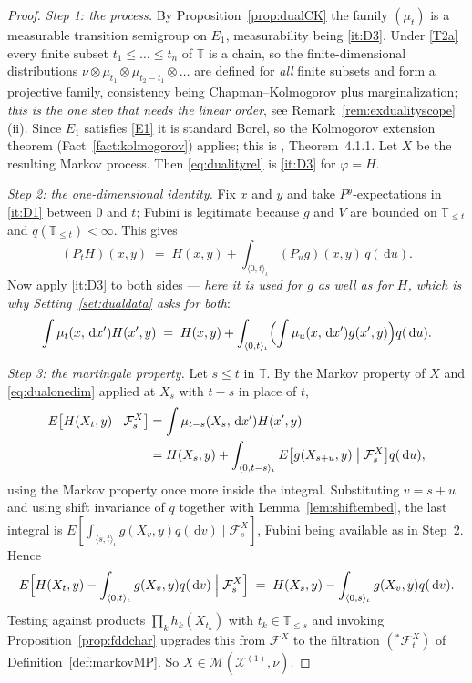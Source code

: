 \documentclass[11pt,a4paper]{article}
\theoremstyle{plain}
\theoremstyle{definition}
\theoremstyle{remark}
\newcommand{\T}{\mathbb{T}}                     %
\newcommand{\Filt}{\mathcal{F}}
\newcommand{\XX}{\mathcal{X}}                  %
\newcommand{\Msol}{\mathcal{M}}
\newcommand{\dif}{\,\mathrm{d}}
\newcommand{\EK}{\cite{EK86}}
\begin{document}
\begin{proof}
  \emph{Step 1: the process.}  By Proposition~\ref{prop:dualCK} the family
  $(\mu_t)$ is a measurable transition semigroup on $E_1$, measurability being
  \ref{it:D3}.  Under \eqref{T2a} every finite subset $t_1 \leq \dots \leq t_n$ of $\T$
  is a chain, so the finite-dimensional distributions
  $\nu \otimes \mu_{t_1} \otimes \mu_{t_2 - t_1} \otimes \dots$ are defined for
  \emph{all} finite subsets and form a projective family, consistency being
  Chapman--Kolmogorov plus marginalization; \emph{this is the one step that
  needs the linear order}, see Remark~\ref{rem:exdualityscope}(ii).  Since $E_1$
  satisfies \eqref{E1} it is standard Borel, so the Kolmogorov extension theorem
  (Fact~\ref{fact:kolmogorov}) applies; this is \EK, Theorem~4.1.1.  Let $X$ be
  the resulting Markov process.  Then \eqref{eq:dualityrel} is \ref{it:D3} for
  $\varphi = H$.

  \emph{Step 2: the one-dimensional identity.}  Fix $x$ and $y$ and take
  $P^y$-expectations in \ref{it:D1} between $0$ and $t$; Fubini is legitimate
  because $g$ and $V$ are bounded on $\T_{\leq t}$ and $q(\T_{\leq t}) < \infty$.
  This gives
  \[
    (P_tH)(x,y) \;=\; H(x,y)
      + \int_{\langle 0,t\rangle_\iota} (P_u g)(x,y) \, q(\dif u) .
  \]
  Now apply \ref{it:D3} to both sides --- \emph{here it is used for $g$ as well as
  for $H$, which is why Setting~\ref{set:dualdata} asks for both}:
  \begin{equation}
    \label{eq:dualonedim}
    \int \mu_t(x,\dif x') H(x',y)
      \;=\; H(x,y)
        + \int_{\langle 0,t\rangle_\iota}
          \Bigl( \int \mu_u(x,\dif x') g(x',y) \Bigr) q(\dif u) .
  \end{equation}

  \emph{Step 3: the martingale property.}  Let $s \leq t$ in $\T$.  By the Markov
  property of $X$ and \eqref{eq:dualonedim} applied at $X_s$ with $t-s$ in place of
  $t$,
  \begin{align*}
    E\bigl[ H(X_t,y) \bigm| \Filt^X_s \bigr]
      &= \int \mu_{t-s}(X_s,\dif x') H(x',y) \\
      &= H(X_s,y) + \int_{\langle 0,t-s\rangle_\iota}
          E\bigl[ g(X_{s+u},y) \bigm| \Filt^X_s \bigr] q(\dif u) ,
  \end{align*}
  using the Markov property once more inside the integral.  Substituting
  $v = s+u$ and using shift invariance of $q$ together with
  Lemma~\ref{lem:shiftembed}, the last integral is
  $E[\int_{\langle s,t\rangle_\iota} g(X_v,y) q(\dif v) \mid \Filt^X_s]$, Fubini
  being available as in Step~2.  Hence
  \[
    E\Bigl[ H(X_t,y) - \int_{\langle 0,t\rangle_\iota} g(X_v,y) q(\dif v)
      \Bigm| \Filt^X_s \Bigr]
    \;=\; H(X_s,y) - \int_{\langle 0,s\rangle_\iota} g(X_v,y) q(\dif v) .
  \]
  Testing against products $\prod_k h_k(X_{t_k})$ with $t_k \in \T_{\leq s}$ and
  invoking Proposition~\ref{prop:fddchar} upgrades this from $\Filt^X$ to the
  filtration $({}^{*}\Filt^X_t)$ of Definition~\ref{def:markovMP}.  So
  $X \in \Msol(\XX^{(1)},\nu)$.
\end{proof}
\end{document}
